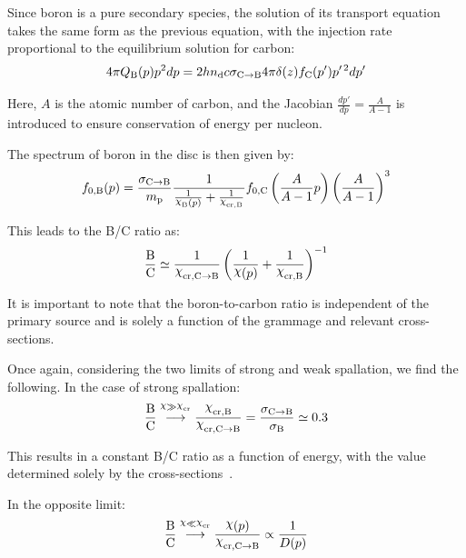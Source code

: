 Since boron is a pure secondary species, the solution of its transport equation takes the same form as the previous equation, with the injection rate proportional to the equilibrium solution for carbon:
%
\begin{equation}
4 \pi Q_{\rm B}(p) p^2 dp = 2 h n_{\rm d} c \sigma_{\rm C \rightarrow B} 4 \pi \delta(z) f_{\rm C}(p^\prime) p^{\prime \, 2} dp^\prime
\end{equation}

Here, $A$ is the atomic number of carbon, and the Jacobian $\frac{dp'}{dp} = \frac{A}{A-1}$ is introduced to ensure conservation of energy per nucleon.

The spectrum of boron in the disc is then given by:
%
\begin{equation}
f_{0,\rm B}(p) 
= \frac{\sigma_{\rm C \rightarrow B}}{m_{\rm p}}  \frac{1}{\frac{1}{\rchi_{\rm B}(p)} + \frac{1}{\rchi_{\rm cr, B}}} f_{0, \rm C}\left(\frac{A}{A-1}p\right) \left(\frac{A}{A-1} \right)^3
\end{equation}

This leads to the B/C ratio as:
%
\begin{equation}
\frac{\rm B}{\rm C} \simeq \frac{1}{\rchi_{\rm cr, C\rightarrow B}} \left(\frac{1}{\rchi(p)} + \frac{1}{\rchi_{\rm cr, B}}\right)^{-1}
\label{eq:chibc}
\end{equation}

It is important to note that the boron-to-carbon ratio is independent of the primary source and is solely a function of the grammage and relevant cross-sections.

Once again, considering the two limits of strong and weak spallation, we find the following. 
%
In the case of strong spallation:
%
\begin{equation}
\frac{\rm B}{\rm C} \oset{\rchi \gg \rchi_{\rm cr}}{\, \longrightarrow \,} \frac{\rchi_{\rm cr, B}}{\rchi_{\rm cr, C\rightarrow B}} 
= \frac{\sigma_{\rm C \rightarrow B}}{\sigma_{\rm B}} 
\simeq 0.3
\end{equation}

This results in a constant B/C ratio as a function of energy, with the value determined solely by the cross-sections~\cite{Evoli2019prd}.

In the opposite limit:
%
\begin{equation}
\frac{\rm B}{\rm C} \oset{\rchi \ll \rchi_{\rm cr}}{\, \longrightarrow \,} \frac{\rchi(p)}{\rchi_{\rm cr, C\rightarrow B}} \propto \frac{1}{D(p)}
\label{eq:bchene}
\end{equation}

